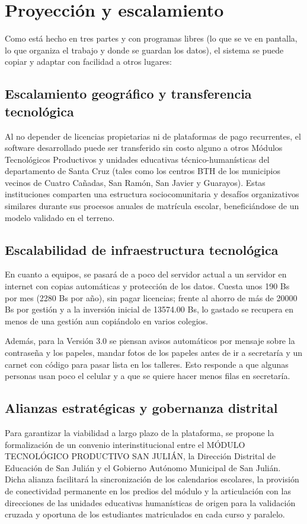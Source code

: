 \section{Proyección y escalamiento}
\label{sec:proyeccion_escalamiento}

Como está hecho en tres partes y con programas libres (lo que se ve en pantalla, lo que organiza el trabajo y donde se guardan los datos), el sistema se puede copiar y adaptar con facilidad a otros lugares:

\subsection{Escalamiento geográfico y transferencia tecnológica}

Al no depender de licencias propietarias ni de plataformas de pago recurrentes, el software desarrollado puede ser transferido sin costo alguno a otros Módulos Tecnológicos Productivos y unidades educativas técnico-humanísticas del departamento de Santa Cruz (tales como los centros BTH de los municipios vecinos de Cuatro Cañadas, San Ramón, San Javier y Guarayos). Estas instituciones comparten una estructura sociocomunitaria y desafíos organizativos similares durante sus procesos anuales de matrícula escolar, beneficiándose de un modelo validado en el terreno.

\subsection{Escalabilidad de infraestructura tecnológica}

En cuanto a equipos, se pasará de a poco del servidor actual a un servidor en internet con copias automáticas y protección de los datos. Cuesta unos 190 Bs por mes (2280 Bs por año), sin pagar licencias; frente al ahorro de más de 20000 Bs por gestión y a la inversión inicial de 13574.00 Bs, lo gastado se recupera en menos de una gestión aun copiándolo en varios colegios.

Además, para la Versión 3.0 se piensan avisos automáticos por mensaje sobre la contraseña y los papeles, mandar fotos de los papeles antes de ir a secretaría y un carnet con código para pasar lista en los talleres. Esto responde a que algunas personas usan poco el celular y a que se quiere hacer menos filas en secretaría.

\subsection{Alianzas estratégicas y gobernanza distrital}

Para garantizar la viabilidad a largo plazo de la plataforma, se propone la formalización de un convenio interinstitucional entre el MÓDULO TECNOLÓGICO PRODUCTIVO SAN JULIÁN, la Dirección Distrital de Educación de San Julián y el Gobierno Autónomo Municipal de San Julián. Dicha alianza facilitará la sincronización de los calendarios escolares, la provisión de conectividad permanente en los predios del módulo y la articulación con las direcciones de las unidades educativas humanísticas de origen para la validación cruzada y oportuna de los estudiantes matriculados en cada curso y paralelo.
